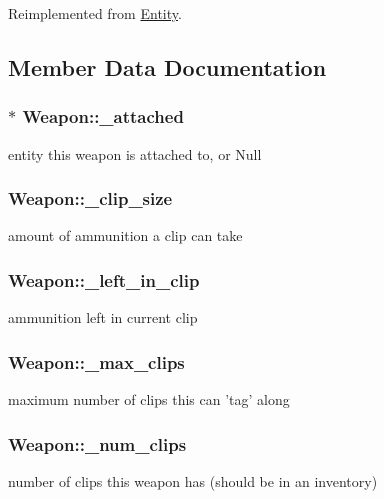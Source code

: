 Reimplemented from \hyperlink{class_entity_a3e1914489e4bed4f9f23cdeab34a43dc}{Entity}.



\subsection{Member Data Documentation}
\subsubsection[{\-\_\-attached}]{$\ast$ Weapon\-::\-\_\-attached\hspace{0.3cm}{\ttfamily [protected]}}\label{class_weapon_ab248a10c00a363413349dc58860fa1fa}
entity this weapon is attached to, or Null 
\subsubsection[{\-\_\-clip\-\_\-size}]{ Weapon\-::\-\_\-clip\-\_\-size\hspace{0.3cm}{\ttfamily [protected]}}\label{class_weapon_a316034dd390b487c61e4dfca16617983}
amount of ammunition a clip can take 
\subsubsection[{\-\_\-left\-\_\-in\-\_\-clip}]{ Weapon\-::\-\_\-left\-\_\-in\-\_\-clip\hspace{0.3cm}{\ttfamily [protected]}}\label{class_weapon_a7b7c30447a03543f830c870bd1ec8a32}
ammunition left in current clip 
\subsubsection[{\-\_\-max\-\_\-clips}]{ Weapon\-::\-\_\-max\-\_\-clips\hspace{0.3cm}{\ttfamily [protected]}}\label{class_weapon_ad71351329aa1373da91c0f773dad887b}
maximum number of clips this can 'tag' along 
\subsubsection[{\-\_\-num\-\_\-clips}]{ Weapon\-::\-\_\-num\-\_\-clips\hspace{0.3cm}{\ttfamily [protected]}}\label{class_weapon_af2cfb95c5dc297747475435c2201d592}
number of clips this weapon has (should be in an inventory) 